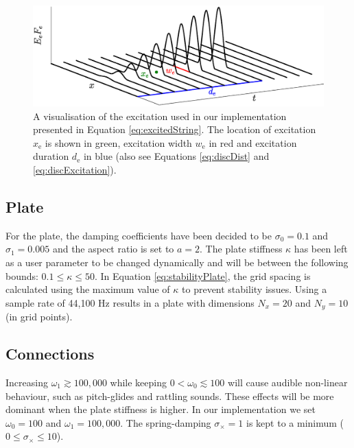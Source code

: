 \documentclass{article}
\begin{document}
\begin{figure}[h]
\centering
\includegraphics[width=1.0\columnwidth]{excitation2.eps}
\caption{A visualisation of the excitation used in our implementation presented in Equation \eqref{eq:excitedString}. The location of excitation $x_\text{e}$ is shown in green, excitation width $w_\text{e}$ in red and excitation duration $d_\text{e}$ in blue (also see Equations \eqref{eq:discDist} and \eqref{eq:discExcitation}). \label{fig:exctiation}}
\end{figure}

\subsection{Plate}
For the plate, the damping coefficients have been decided to be $\sigma_0 = 0.1$ and $\sigma_1 = 0.005$ and the aspect ratio is set to $a = 2$. The plate stiffness $\kappa$ has been left as a user parameter to be changed dynamically and will be between the following bounds: $0.1 \leq \kappa \leq 50$. In Equation \eqref{eq:stabilityPlate}, the grid spacing is calculated using the maximum value of $\kappa$ to prevent stability issues. Using a sample rate of 44,100 Hz results in a plate with dimensions $N_x = 20$ and $N_y = 10$ (in grid points).

\subsection{Connections}
Increasing $\omega_1 \gtrsim 100,000$ while keeping $0 < \omega_0 \lesssim 100$ will cause audible non-linear behaviour, such as pitch-glides and rattling sounds. These effects will be more dominant when the plate stiffness is higher. %
In our implementation we set $\omega_0=100$ and $\omega_1 = 100,000$. The spring-damping $\sigma_\times = 1$ is kept to a minimum ($0 \leq \sigma_\times \leq 10$). 
\end{document}
